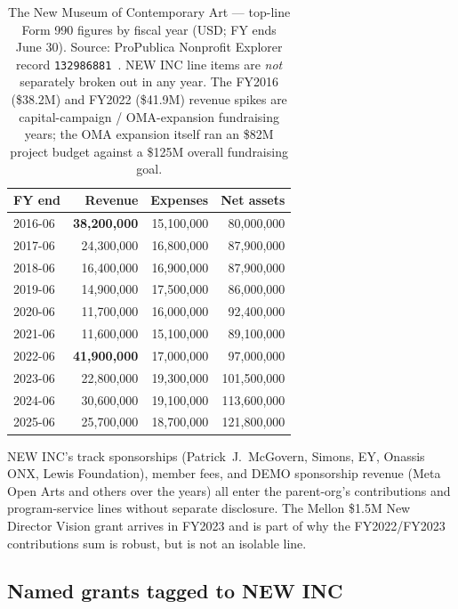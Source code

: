 \documentclass[10pt,letterpaper,twocolumn]{article}
\begin{document}
\begin{table}[h]
\footnotesize
\centering
\setlength{\tabcolsep}{4pt}
\begin{tabularx}{\columnwidth}{Xrrr}
\toprule
\textbf{FY end} & \textbf{Revenue} & \textbf{Expenses} & \textbf{Net assets} \\
\midrule
2016-06 & \textbf{38,200,000} & 15,100,000 & 80,000,000 \\
2017-06 & 24,300,000 & 16,800,000 & 87,900,000 \\
2018-06 & 16,400,000 & 16,900,000 & 87,900,000 \\
2019-06 & 14,900,000 & 17,500,000 & 86,000,000 \\
2020-06 & 11,700,000 & 16,000,000 & 92,400,000 \\
2021-06 & 11,600,000 & 15,100,000 & 89,100,000 \\
2022-06 & \textbf{41,900,000} & 17,000,000 & 97,000,000 \\
2023-06 & 22,800,000 & 19,300,000 & 101,500,000 \\
2024-06 & 30,600,000 & 19,100,000 & 113,600,000 \\
2025-06 & 25,700,000 & 18,700,000 & 121,800,000 \\
\bottomrule
\end{tabularx}
\caption{The New Museum of Contemporary Art --- top-line Form 990 figures by fiscal year (USD; FY ends June 30). Source: ProPublica Nonprofit Explorer record \texttt{132986881}~\citep{propublica2026newmuseum}. NEW INC line items are \emph{not} separately broken out in any year. The FY2016 (\$38.2M) and FY2022 (\$41.9M) revenue spikes are capital-campaign / OMA-expansion fundraising years; the OMA expansion itself ran an \$82M project budget against a \$125M overall fundraising goal.}
\label{tab:financials}
\end{table}

NEW INC's track sponsorships (Patrick~J.~McGovern, Simons, EY, Onassis ONX, Lewis Foundation), member fees, and DEMO sponsorship revenue (Meta Open Arts and others over the years) all enter the parent-org's contributions and program-service lines without separate disclosure. The Mellon \$1.5M New Director Vision grant arrives in FY2023 and is part of why the FY2022/FY2023 contributions sum is robust, but is not an isolable line.

\subsection{Named grants tagged to NEW INC}\label{sec:grants}
\end{document}
